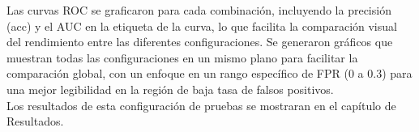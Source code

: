 Las curvas ROC se graficaron para cada combinación, incluyendo la precisión (acc) y el AUC en la etiqueta de la curva, lo que facilita la comparación visual del rendimiento entre las diferentes configuraciones. Se generaron gráficos que muestran todas las configuraciones en un mismo plano para facilitar la comparación global, con un enfoque en un rango específico de FPR (0 a 0.3) para una mejor legibilidad en la región de baja tasa de falsos positivos.\\

Los resultados de esta configuración de pruebas se mostraran en el capítulo de Resultados.